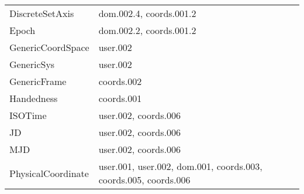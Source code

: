\begin{longtable}[l]{|l|l|}
        DiscreteSetAxis                   & dom.002.4, coords.001.2                     \\
        Epoch                             & dom.002.2, coords.001.2                     \\
        GenericCoordSpace                 & user.002                                    \\
        GenericSys                        & user.002                                    \\
        GenericFrame                      & coords.002                                  \\
        Handedness                        & coords.001                                  \\
        ISOTime                           & user.002, coords.006                        \\
        JD                                & user.002, coords.006                        \\
        MJD                               & user.002, coords.006                        \\
        PhysicalCoordinate                & user.001, user.002, dom.001, coords.003, coords.005, coords.006 \\

\end{longtable}
